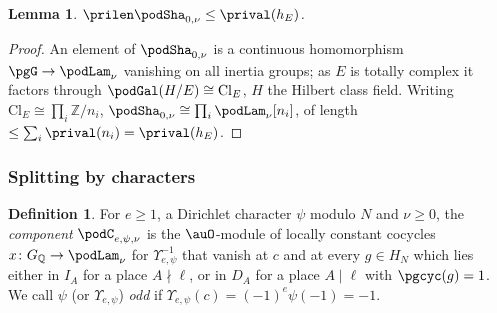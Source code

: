 \documentclass[10pt]{amsart}
\newtheorem{lemma}[theorem]{Lemma}
\theoremstyle{definition}
\newtheorem{definition}[theorem]{Definition}
\theoremstyle{remark}
\newcommand{\Z}{\mathbb Z}
\newcommand{\Q}{\mathbb Q}
\begin{document}
\begin{lemma}\label{pod:e0}
$\prilen\podSha_{0,\nu}\le\prival(h_E)$.
\end{lemma}
\begin{proof}
An element of $\podSha_{0,\nu}$ is a continuous homomorphism $\pgG\to\podLam_\nu$ vanishing on all
inertia groups; as $E$ is totally complex it factors through $\podGal(H/E)\cong\mathrm{Cl}_E$, $H$
the Hilbert class field. Writing $\mathrm{Cl}_E\cong\prod_i\Z/n_i$, $\podSha_{0,\nu}\cong
\prod_i\podLam_\nu[n_i]$, of length $\le\sum_i\prival(n_i)=\prival(h_E)$.
\end{proof}

\subsubsection{Splitting by characters}\label{pod:ss-split}

\begin{definition}\label{pod:def-comp}
For $e\ge1$, a Dirichlet character $\psi$ modulo $N$ and $\nu\ge0$, the \emph{component}
$\podC_{e,\psi,\nu}$ is the $\auO$-module of locally constant cocycles $x\colon G_\Q\to\podLam_\nu$
for $\Upsilon_{e,\psi}^{-1}$ that vanish at $c$ and at every $g\in H_N$ which lies either in $I_A$ for
a place $A\nmid\ell$, or in $D_A$ for a place $A\mid\ell$ with $\pgcyc(g)=1$. We call $\psi$ (or
$\Upsilon_{e,\psi}$) \emph{odd} if $\Upsilon_{e,\psi}(c)=(-1)^e\psi(-1)=-1$.
\end{definition}
\end{document}
